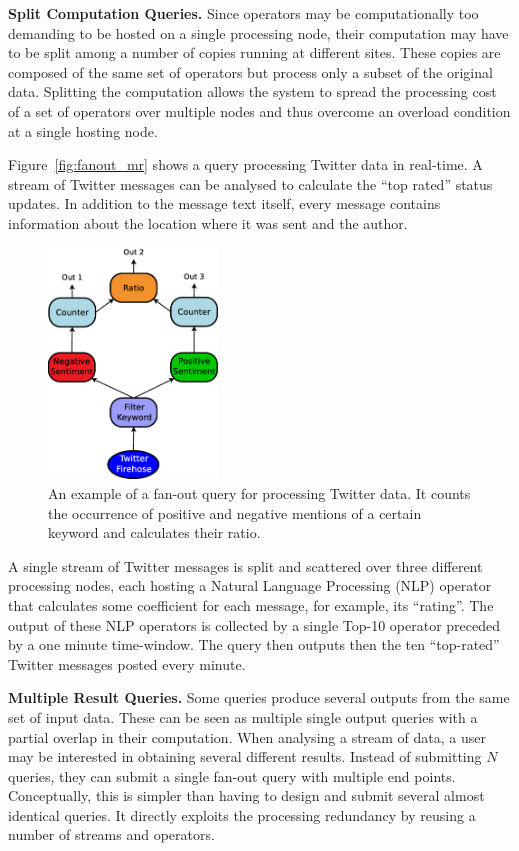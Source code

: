 \textbf{Split Computation Queries.} 
Since operators may be computationally too demanding to be hosted on a single processing node, their
computation may have to be split among a number of copies running at different sites. These
copies are composed of the same set of operators but process only a subset of the original data.
Splitting the computation allows the system to spread the processing cost of a set of operators over
multiple nodes and thus overcome an overload condition at a single hosting node. 

\ex Figure~\ref{fig:fanout_mr} shows a query processing Twitter data in
real-time. A stream of Twitter messages can be analysed to calculate the ``top rated'' status updates.
In addition to the message text itself, every message contains information about the location where it
was sent and the author.
\begin{figure}[b!]
	\centering
	\includegraphics[width=0.4\textwidth]{img/tesi/fan-out_2_senza} 
	\caption{An example of a fan-out query for processing Twitter data. It counts the occurrence of positive
	and negative mentions of a certain keyword and calculates their ratio.}
	\label{fig:query_fanouts}
\end{figure}
A single stream of Twitter messages is split and scattered over three different processing nodes, each
hosting a Natural Language Processing (NLP) operator that calculates some coefficient for each message,
for example, its ``rating''. The output of these NLP operators is collected by a single Top-10
operator preceded by a one minute time-window. The query then outputs then the ten ``top-rated'' Twitter
messages posted every minute. 

\textbf{Multiple Result Queries.} Some queries produce several outputs from the same set of
input data.
These can be seen as multiple single output queries with a partial overlap in their computation. When analysing a
stream of data, a user may be interested in obtaining several different results. Instead of submitting
$N$ queries, they can submit a single fan-out query with multiple end points. Conceptually, this is
simpler than having to design and submit several almost identical queries. It directly exploits the
processing redundancy by reusing a number of streams and operators.


